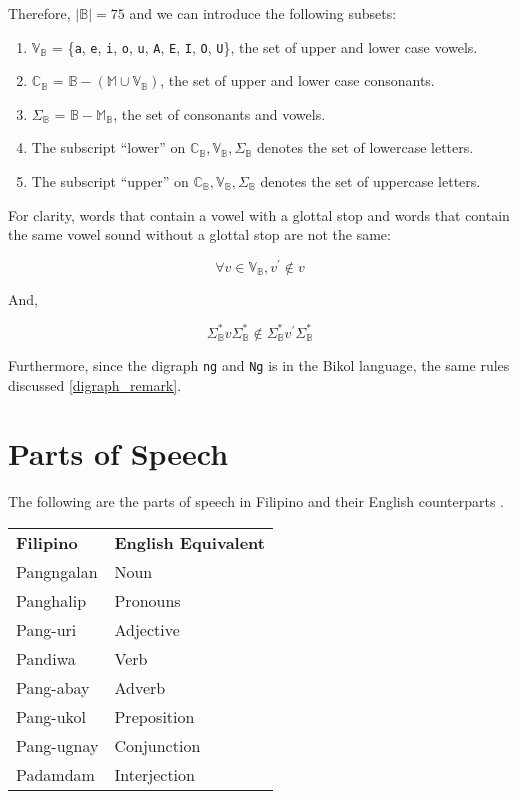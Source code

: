 Therefore, $|\mathbb{B}|=75$ and we can introduce the following subsets:
\begin{enumerate}
    \item \(\mathbb{V}_\mathbb{B}\) = \{\texttt{a}, \texttt{e}, \texttt{i}, \texttt{o}, \texttt{u}, \texttt{A}, \texttt{E}, \texttt{I}, \texttt{O}, \texttt{U}\}, the set of upper and lower case vowels.
    \item \(\mathbb{C}_\mathbb{B}\) = \(\mathbb{B} - (\mathbb{M} \cup \mathbb{V}_\mathbb{B})\),
          the set of upper and lower case consonants.
    \item \(\Sigma_\mathbb{B}\) = \(\mathbb{B} - \mathbb{M}_\mathbb{B}\), the set of consonants and vowels.
    \item The subscript “lower” on \(\mathbb{C}_\mathbb{B}, \mathbb{V}_\mathbb{B}, \Sigma_\mathbb{B}\) denotes the set of lowercase letters.
    \item The subscript “upper” on \(\mathbb{C}_\mathbb{B}, \mathbb{V}_\mathbb{B}, \Sigma_\mathbb{B}\) denotes the set of uppercase letters.
\end{enumerate}

For clarity, words that contain a vowel with a glottal stop and words that contain the same vowel sound without a glottal stop are not the same:

\[
    \forall v\in\mathbb{V}_\mathbb{B}, v^\prime\notin v
\]

And,

\[
    \Sigma_\mathbb{B}^*v\Sigma_\mathbb{B}^*\notin \Sigma_\mathbb{B}^*v^\prime\Sigma_\mathbb{B}^*
\]

Furthermore, since the digraph \texttt{ng} and \texttt{Ng} is in the Bikol language, the same rules discussed \ref{digraph_remark}.

\section{Parts of Speech}

The following are the parts of speech in Filipino and their English counterparts \cite{OOP}.

\begin{center}
    \begin{tabular}{ll}
         \textbf{Filipino} & \textbf{English Equivalent}  \\
         Pangngalan & Noun \\
         Panghalip & Pronouns \\
         Pang-uri & Adjective \\
         Pandiwa & Verb  \\
         Pang-abay & Adverb \\
         Pang-ukol & Preposition \\
         Pang-ugnay & Conjunction \\ 
         Padamdam & Interjection
    \end{tabular}
\end{center}

